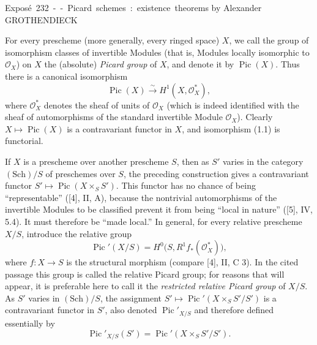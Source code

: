 \unit{Exposé 232 -- Picard schemes: existence theorems}
%
  {by Alexander GROTHENDIECK}


For every prescheme (more generally, every ringed space) $X$, we call the group
of isomorphism classes of invertible Modules (that is, Modules locally
isomorphic to $\mathcal O_X$) on $X$ the (absolute) \emph{Picard group} of $X$,
and denote it by $\operatorname{Pic}(X)$. Thus there is a canonical isomorphism
\begin{equation}
\operatorname{Pic}(X)\xrightarrow{\sim}H^1(X,\mathcal O_X^*),
\tag{1.1}
\end{equation}
where $\mathcal O_X^*$ denotes the sheaf of units of $\mathcal O_X$ (which is
indeed identified with the sheaf of automorphisms of the standard invertible
Module $\mathcal O_X$). Clearly $X\longmapsto\operatorname{Pic}(X)$ is a
contravariant functor in $X$, and isomorphism (1.1) is functorial.

If $X$ is a prescheme over another prescheme $S$, then as $S'$ varies in the
category $(\mathrm{Sch})/S$ of preschemes over $S$, the preceding construction
gives a contravariant functor
$S'\longmapsto\operatorname{Pic}(X\times_SS')$. This functor has no chance of
being “representable” ([4], II, A), because the nontrivial automorphisms of the
invertible Modules to be classified prevent it from being “local in nature”
([5], IV, 5.4). It must therefore be “made local.” In general, for every
relative prescheme $X/S$, introduce the relative group
\begin{equation}
\operatorname{Pic}'(X/S)=H^0\bigl(S,R^1f_*(\mathcal O_X^*)\bigr),
\tag{1.2}
\end{equation}
where $f:X\longrightarrow S$ is the structural morphism (compare [4], II,
C 3). In the cited passage this group is called the relative Picard group; for
reasons that will appear, it is preferable here to call it the
\emph{restricted relative Picard group} of $X/S$. As $S'$ varies in
$(\mathrm{Sch})/S$, the assignment
$S'\longmapsto\operatorname{Pic}'(X\times_SS'/S')$ is a contravariant functor
in $S'$, also denoted $\operatorname{Pic}'_{X/S}$ and therefore defined
essentially by
\begin{equation}
\operatorname{Pic}'_{X/S}(S')=
\operatorname{Pic}'(X\times_SS'/S').
\tag{1.3}
\end{equation}


